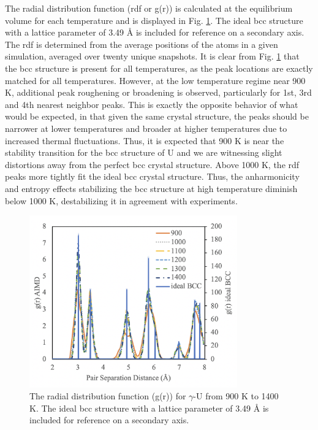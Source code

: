 \documentclass[review]{elsarticle}
\begin{document}
\FloatBarrier

The radial distribution function (rdf or g(r)) is calculated at the equilibrium volume for each temperature and is displayed in Fig. \ref{fig:rdf}. The ideal bcc structure with a lattice parameter of 3.49 {\AA} is included for reference on a secondary axis. The rdf is determined from the average positions of the atoms in a given simulation, averaged over twenty unique snapshots. It is clear from Fig. \ref{fig:rdf} that the bcc structure is present for all temperatures, as the peak locations are exactly matched for all temperatures. However, at the low temperature regime near 900 K, additional peak roughening or broadening is observed, particularly for 1st, 3rd and 4th nearest neighbor peaks. This is exactly the opposite behavior of what would be expected, in that given the same crystal structure, the peaks should be narrower at lower temperatures and broader at higher temperatures due to increased thermal fluctuations. Thus, it is expected that 900 K is near the stability transition for the bcc structure of U and we are witnessing slight distortions away from the perfect bcc crystal structure. Above 1000 K, the rdf peaks more tightly fit the ideal bcc crystal structure. Thus, the anharmonicity and entropy effects stabilizing the bcc structure at high temperature diminish below 1000 K, destabilizing it in agreement with experiments.


\begin{figure}[h]
 \centering
 \includegraphics[width=0.8\textwidth]{4_rdf.png} 
 \caption{The radial distribution function (g(r)) for $\gamma$-U from 900 K to 1400 K. The ideal bcc structure with a lattice parameter of 3.49 {\AA} is included for reference on a secondary axis.  }
 \label{fig:rdf}
\end{figure}
\end{document}
